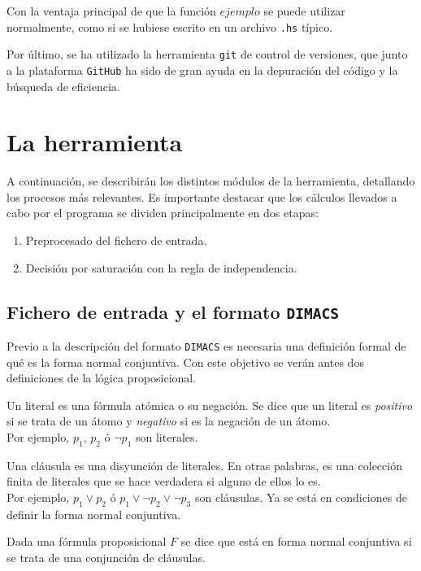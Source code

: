 Con la ventaja principal de que la función $ejemplo$ se puede utilizar normalmente, como si se hubiese escrito en un archivo \texttt{.hs} típico.

Por último, se ha utilizado la herramienta \texttt{git} de control de versiones, que junto a la plataforma \texttt{GitHub} ha sido de gran ayuda en la depuración del código y la búsqueda de eficiencia.

\section{La herramienta}
A continuación, se describirán los distintos módulos de la herramienta, detallando los procesos más relevantes. Es importante destacar que los cálculos llevados a cabo por el programa se dividen principalmente en dos etapas:
\begin{enumerate}
\item Preprocesado del fichero de entrada.
\item Decisión por saturación con la regla de independencia.
\end{enumerate}

\subsection{Fichero de entrada y el formato \texttt{DIMACS}}
Previo a la descripción del formato \texttt{DIMACS} es necesaria una definición formal de qué es la forma normal conjuntiva. Con este objetivo se verán antes dos definiciones de la lógica proposicional.

 Un literal es una fórmula atómica o su negación. Se dice que un literal es \textit{positivo} si se trata de un átomo y \textit{negativo} si es la negación de un átomo.\\

Por ejemplo, $p_1$, $p_2$ ó $\neg p_1$ son literales.

 Una cláusula es una disyunción de literales. En otras palabras, es una colección finita de literales que se hace verdadera si alguno de ellos lo es. \\

Por ejemplo, $p_1 \vee p_2$ ó $p_1 \vee \neg p_2 \vee \neg p_3$ son cláusulas. Ya se está en condiciones de definir la forma normal conjuntiva.

 Dada una fórmula proposicional $F$ se dice que está en forma normal conjuntiva si se trata de una conjunción de cláusulas. \\

